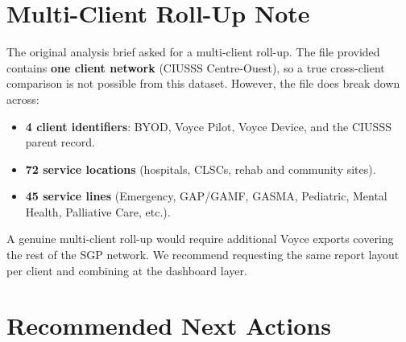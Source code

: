 \documentclass[11pt,a4paper]{article}
\begin{document}

\section{Multi-Client Roll-Up Note}
The original analysis brief asked for a multi-client roll-up. The file
provided contains \textbf{one client network} (CIUSSS Centre-Ouest), so
a true cross-client comparison is not possible from this dataset.
However, the file does break down across:

\begin{itemize}
  \item \textbf{4 client identifiers}: BYOD, Voyce Pilot, Voyce
        Device, and the CIUSSS parent record.
  \item \textbf{72 service locations} (hospitals, CLSCs, rehab and
        community sites).
  \item \textbf{45 service lines} (Emergency, GAP/GAMF, GASMA,
        Pediatric, Mental Health, Palliative Care, etc.).
\end{itemize}

A genuine multi-client roll-up would require additional Voyce exports
covering the rest of the SGP network. We recommend requesting the same
report layout per client and combining at the dashboard layer.

\section{Recommended Next Actions}
\end{document}
